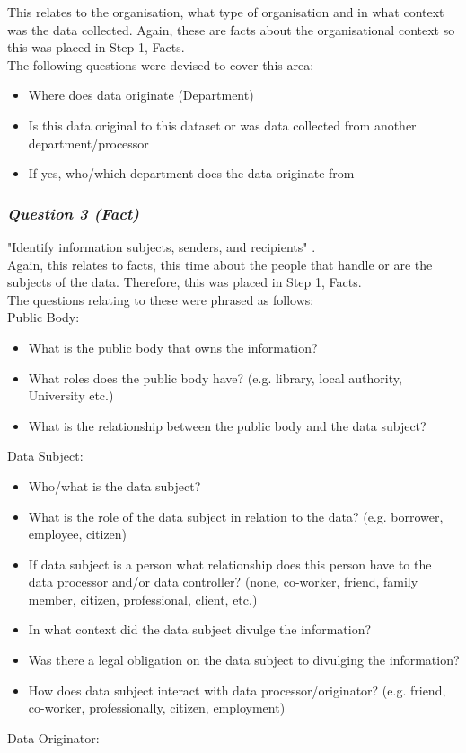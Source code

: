 This relates to the organisation, what type of organisation and in what context was the data collected. Again, these are facts about the organisational context so this was placed in Step 1, Facts.\\

The following questions were devised to cover this area:

\begin{itemize}

\item Where does data originate (Department)
\item Is this data original to this dataset or was data collected from another department/processor
\item If yes, who/which department does the data originate from
\end{itemize}

\subsubsection {{\it Question 3 {\bf(Fact)}}}
"Identify information subjects, senders, and recipients" \cite{Nissenbaum_2010}.\\

Again, this relates to facts, this time about the people that handle or are the subjects of the data. Therefore, this was placed in Step 1, Facts. \\

The questions relating to these were phrased as follows:\\

Public Body:
\begin{itemize}

\item What is the public body that owns the information?
\item What roles does the public body have? (e.g. library, local authority, University etc.)
\item What is the relationship between the public body and the data subject?\\
\end{itemize}

Data Subject:
\begin{itemize}
\item Who/what is the data subject?
\item What is the role of the data subject in relation to the data? (e.g. borrower, employee, citizen)
\item If data subject is a person what relationship does this person have to the data processor and/or data controller? (none, co-worker, friend, family member, citizen, professional, client, etc.)
\item In what context did the data subject divulge the information?
\item Was there a legal obligation on the data subject to divulging the information?
\item How does data subject interact with data processor/originator? (e.g. friend, co-worker, professionally, citizen, employment)\\
\end{itemize}
Data Originator:\\


